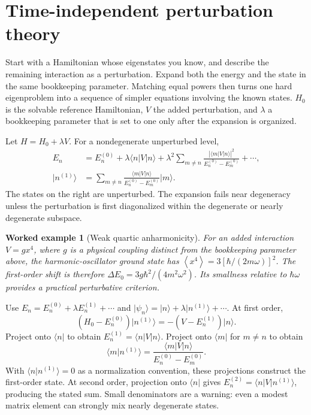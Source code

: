 \documentclass[11pt,oneside]{book}
\newcommand{\avg}[1]{\left\langle #1\right\rangle}
\newcommand{\ket}[1]{\lvert #1\rangle}
\newcommand{\bra}[1]{\langle #1\rvert}
\theoremstyle{reviewstyle}
\newtheorem{example}{Worked example}[chapter]
\begin{document}
\section{Time-independent perturbation theory}
Start with a Hamiltonian whose eigenstates you know, and describe the remaining interaction as a perturbation. Expand both the energy and the state in the same bookkeeping parameter. Matching equal powers then turns one hard eigenproblem into a sequence of simpler equations involving the known states. $H_0$ is the solvable reference Hamiltonian, $V$ the added perturbation, and $\lambda$ a bookkeeping parameter that is set to one only after the expansion is organized.

Let $H=H_0+\lambda V$. For a nondegenerate unperturbed level,
\begin{align}
E_n&=E_n^{(0)}+\lambda\bra n V\ket n+
\lambda^2\sum_{m\neq n}\frac{|\bra m V\ket n|^2}{E_n^{(0)}-E_m^{(0)}}+\cdots,\\
\ket{n^{(1)}}&=\sum_{m\neq n}\frac{\bra m V\ket n}{E_n^{(0)}-E_m^{(0)}}\ket m.
\end{align}
The states on the right are unperturbed. The expansion fails near degeneracy unless the perturbation is first diagonalized within the degenerate or nearly degenerate subspace.
\begin{example}[Weak quartic anharmonicity]
For an added interaction $V=gx^4$, where $g$ is a physical coupling distinct from the bookkeeping parameter above, the harmonic-oscillator ground state has $\avg{x^4}=3[\hbar/(2m\omega)]^2$. The first-order shift is therefore $\Delta E_0=3g\hbar^2/(4m^2\omega^2)$. Its smallness relative to $\hbar\omega$ provides a practical perturbative criterion.
\end{example}

Use $E_n=E_n^{(0)}+\lambda E_n^{(1)}+\cdots$ and $\ket{\psi_n}=\ket n+\lambda\ket{n^{(1)}}+\cdots$. At first order,
\begin{equation}
(H_0-E_n^{(0)})\ket{n^{(1)}}=-(V-E_n^{(1)})\ket n.
\end{equation}
Project onto $\bra n$ to obtain $E_n^{(1)}=\bra nV\ket n$. Project onto $\bra m$ for $m\ne n$ to obtain
\begin{equation}
\bra m n^{(1)}\rangle=\frac{\bra mV\ket n}{E_n^{(0)}-E_m^{(0)}}.
\end{equation}
With $\bra n n^{(1)}\rangle=0$ as a normalization convention, these projections construct the first-order state. At second order, projection onto $\bra n$ gives $E_n^{(2)}=\bra nV\ket{n^{(1)}}$, producing the stated sum. Small denominators are a warning: even a modest matrix element can strongly mix nearly degenerate states.
\end{document}
